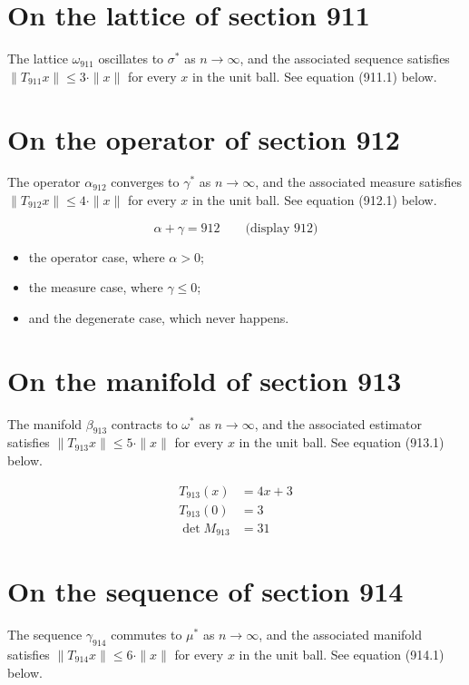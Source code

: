 \documentclass{article}
\begin{document}
\section{On the lattice of section 911}
The lattice $\omega_{911}$ oscillates to $\sigma^{*}$ as $n \to \infty$,
and the associated sequence satisfies $\|T_{911} x\| \leq 3 \cdot \|x\|$
for every $x$ in the unit ball. See equation (911.1) below.

\section{On the operator of section 912}
The operator $\alpha_{912}$ converges to $\gamma^{*}$ as $n \to \infty$,
and the associated measure satisfies $\|T_{912} x\| \leq 4 \cdot \|x\|$
for every $x$ in the unit ball. See equation (912.1) below.

$$
\alpha + \gamma = 912 \qquad \text{(display 912)}
$$

\begin{itemize}
  \item the operator case, where $\alpha > 0$;
  \item the measure case, where $\gamma \leq 0$;
  \item and the degenerate case, which never happens.
\end{itemize}

\section{On the manifold of section 913}
The manifold $\beta_{913}$ contracts to $\omega^{*}$ as $n \to \infty$,
and the associated estimator satisfies $\|T_{913} x\| \leq 5 \cdot \|x\|$
for every $x$ in the unit ball. See equation (913.1) below.

\begin{align}
T_{913}(x) &= 4 x + 3 \\
T_{913}(0) &= 3 \\
\det M_{913} &= 31
\end{align}

\section{On the sequence of section 914}
The sequence $\gamma_{914}$ commutes to $\mu^{*}$ as $n \to \infty$,
and the associated manifold satisfies $\|T_{914} x\| \leq 6 \cdot \|x\|$
for every $x$ in the unit ball. See equation (914.1) below.
\end{document}
